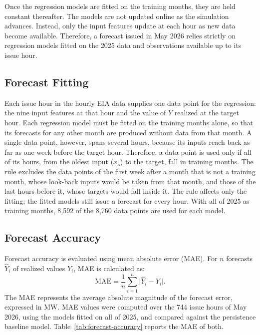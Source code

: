 \documentclass{UNCC-thesis}
\begin{document}
Once the regression models are fitted on the training months, they are held
constant thereafter. The models are not updated online as the
simulation advances. Instead, only the input features update at each hour as new
data become available. Therefore, a forecast issued in May 2026 relies strictly on
regression models fitted on the 2025 data and observations available up to its issue hour.

\subsection{Forecast Fitting}
\label{subsec:forecast-fitting}
Each issue hour in the hourly EIA data supplies one data point for the regression:
the nine input features at that hour and the value of \(Y\) realized at the target
hour. Each regression model must be fitted on the training months alone, so that its forecasts
for any other month are produced without data from that month. A single data point, however,
spans several hours, because its inputs reach back as far as one week before the target hour.
Therefore, a data point is used only if all of its hours, from the oldest input
(\(x_5\)) to the target, fall in training months. The rule excludes the data points of the first
week after a month that is not a training month, whose look-back inputs would be taken from that
month, and those of the last hours before it, whose targets would fall inside it. The rule
affects only the fitting; the fitted models still issue a forecast for every hour. With all of
2025 as training months, 8,592 of the 8,760 data points are used for each model.

\subsection{Forecast Accuracy}
Forecast accuracy is evaluated using mean absolute error (MAE). For \(n\)
forecasts \(\widehat Y_i\) of realized values \(Y_i\), MAE is calculated as:
\begin{equation}
  \mathrm{MAE}
  =
  \frac{1}{n}\sum_{i=1}^{n}\bigl|\widehat Y_i-Y_i\bigr|.
  \label{eq:forecast-metrics}
\end{equation}
The MAE represents the average absolute magnitude of the forecast error,
expressed in MW.
MAE values were computed over the 744 issue hours of May 2026, using the models fitted on all of
2025, and compared against the persistence baseline model. Table~\ref{tab:forecast-accuracy}
reports the MAE of both.
\end{document}
